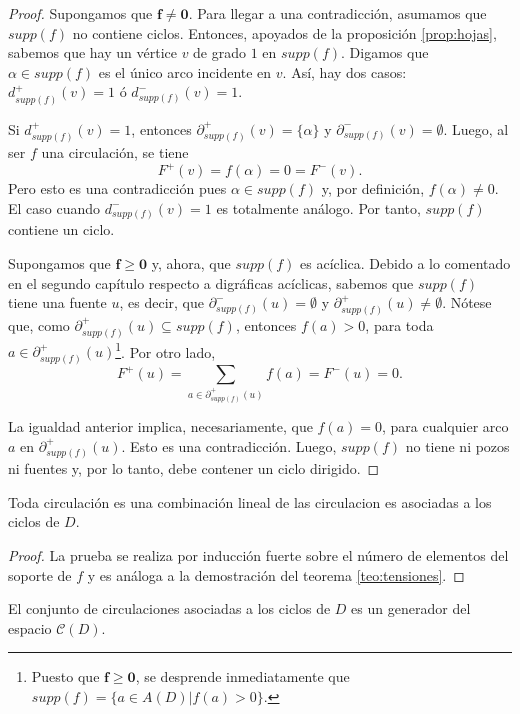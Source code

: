 \begin{proof}
Supongamos que $\mathbf{f} \neq \mathbf{0}$. Para llegar a una contradicción, asumamos que $supp(f)$ no contiene ciclos. Entonces, apoyados de la proposición \ref{prop:hojas}, sabemos que hay un vértice $v$ de grado $1$ en $supp(f)$. Digamos que $\alpha \in supp(f)$ es el único arco incidente en $v$. Así, hay dos casos: $d_{supp(f)}^{+}(v) = 1$ ó $d_{supp(f)}^{-}(v)=1$.

Si $d_{supp(f)}^{+}(v) = 1$, entonces $\partial_{supp(f)}^{+}(v) = \{\alpha\}$ y $\partial_{supp(f)}^{-}(v) = \emptyset$. Luego, al ser $f$ una circulación, se tiene
$$
F^{+}(v) = f(\alpha) = 0 = F^{-}(v).
$$
Pero esto es una contradicción pues $\alpha \in supp(f)$ y, por definición, $f(\alpha) \neq 0$. El caso cuando $d_{supp(f)}^{-}(v)=1$ es totalmente análogo. Por tanto, $supp(f)$ contiene un ciclo.

Supongamos que $\mathbf{f} \geq \mathbf{0}$ y, ahora, que $supp(f)$ es acíclica. Debido a lo comentado en el segundo capítulo respecto a digráficas acíclicas, sabemos que $supp(f)$ tiene una fuente $u$, es decir, que $\partial_{supp(f)}^{-}(u)=\emptyset$ y $\partial_{supp(f)}^{+}(u) \neq \emptyset$. Nótese que, como $ \partial_{supp(f)}^{+}(u) \subseteq supp(f)$, entonces $f(a) > 0$, para toda $a \in \partial_{supp(f)}^{+}(u)$\footnote{Puesto que $\mathbf{f} \geq \mathbf{0}$, se desprende inmediatamente que $supp(f) = \{a \in A(D) | f(a)>0 \}$.}. Por otro lado, 
$$
F^{+}(u)= \sum_{a \in \partial_{supp(f)}^{+}(u)} f(a)= F^{-}(u) = 0.
$$

La igualdad anterior implica, necesariamente, que $f(a) = 0$, para cualquier arco $a$ en $\partial_{supp(f)}^{+}(u)$. Esto es una contradicción. Luego, $supp(f)$ no tiene ni pozos ni fuentes y, por lo tanto, debe contener un ciclo dirigido.

\end{proof}

\begin{teo}
Toda circulación es una combinación lineal de las circulacion es asociadas a los ciclos de $D$.
\end{teo}

\begin{proof}
La prueba se realiza por inducción fuerte sobre el número de elementos del soporte de $f$ y es análoga a la demostración del teorema \ref{teo:tensiones}.
\end{proof}

\begin{cor}
El conjunto de circulaciones asociadas a los ciclos de $D$ es un generador del espacio $\mathcal{C}(D)$.
\end{cor}

